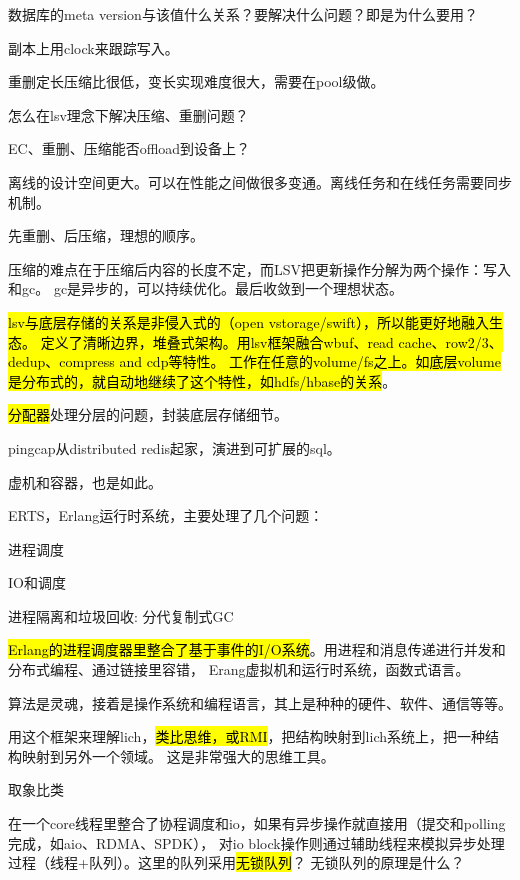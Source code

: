 数据库的meta version与该值什么关系？要解决什么问题？即是为什么要用？

副本上用clock来跟踪写入。

\hrulefill

重删定长压缩比很低，变长实现难度很大，需要在pool级做。

怎么在lsv理念下解决压缩、重删问题？

EC、重删、压缩能否offload到设备上？

离线的设计空间更大。可以在性能之间做很多变通。离线任务和在线任务需要同步机制。

先重删、后压缩，理想的顺序。

压缩的难点在于压缩后内容的长度不定，而LSV把更新操作分解为两个操作：写入和gc。
gc是异步的，可以持续优化。最后收敛到一个理想状态。

\hl{lsv与底层存储的关系是非侵入式的（open vstorage/swift），所以能更好地融入生态。
定义了清晰边界，堆叠式架构。用lsv框架融合wbuf、read cache、row2/3、dedup、compress and cdp等特性。
工作在任意的volume/fs之上。如底层volume是分布式的，就自动地继续了这个特性，如hdfs/hbase的关系}。

\hl{分配器}处理分层的问题，封装底层存储细节。

pingcap从distributed redis起家，演进到可扩展的sql。

虚机和容器，也是如此。

\hrulefill

ERTS，Erlang运行时系统，主要处理了几个问题：
\begin{enumbox}
\item 进程调度
\item IO和调度
\item 进程隔离和垃圾回收: 分代复制式GC
\end{enumbox}

\hl{Erlang的进程调度器里整合了基于事件的I/O系统}。用进程和消息传递进行并发和分布式编程、通过链接里容错，
Erang虚拟机和运行时系统，函数式语言。

算法是灵魂，接着是操作系统和编程语言，其上是种种的硬件、软件、通信等等。

用这个框架来理解lich，\hl{类比思维，或RMI}，把结构映射到lich系统上，把一种结构映射到另外一个领域。
这是非常强大的思维工具。

取象比类

在一个core线程里整合了协程调度和io，如果有异步操作就直接用（提交和polling 完成，如aio、RDMA、SPDK），
对io block操作则通过辅助线程来模拟异步处理过程（线程+队列）。这里的队列采用\hl{无锁队列}？
无锁队列的原理是什么？

